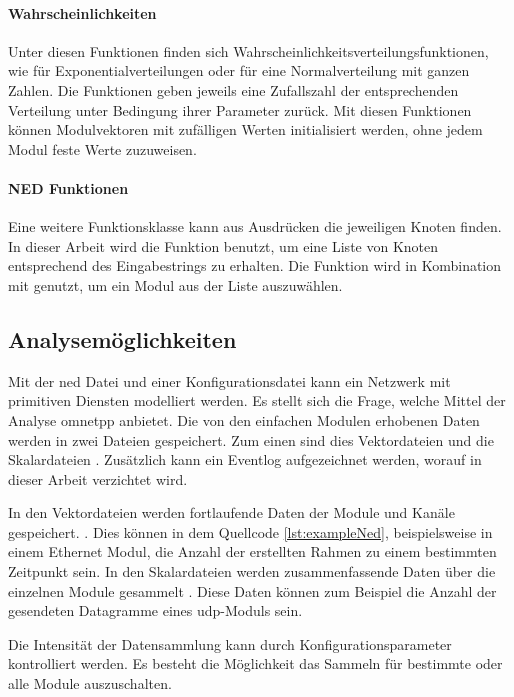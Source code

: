 \paragraph{Wahrscheinlichkeiten}
Unter diesen Funktionen finden sich Wahrscheinlichkeitsverteilungsfunktionen, wie  für Exponentialverteilungen oder  für eine Normalverteilung mit ganzen Zahlen. Die Funktionen geben jeweils eine Zufallszahl der entsprechenden Verteilung unter Bedingung ihrer Parameter zurück. Mit diesen Funktionen können Modulvektoren mit zufälligen Werten initialisiert werden, ohne jedem Modul feste Werte zuzuweisen.

\paragraph{NED Funktionen}
Eine weitere Funktionsklasse kann aus Ausdrücken die jeweiligen Knoten finden. In dieser Arbeit wird die Funktion  benutzt, um eine Liste von Knoten entsprechend des Eingabestrings zu erhalten. Die Funktion  wird in Kombination mit  genutzt, um ein Modul aus der Liste auszuwählen.

\subsection{Analysemöglichkeiten}
Mit der \gls{ned} Datei und einer Konfigurationsdatei kann ein Netzwerk mit primitiven Diensten modelliert werden. Es stellt sich die Frage, welche Mittel der Analyse \gls{omnetpp} anbietet. Die von den einfachen Modulen erhobenen Daten werden in zwei Dateien gespeichert. Zum einen sind dies Vektordateien  und die Skalardateien . Zusätzlich kann ein Eventlog aufgezeichnet werden, worauf in dieser Arbeit verzichtet wird.

In den Vektordateien werden fortlaufende Daten der Module und Kanäle gespeichert. \cite[]{OmnetManual}. Dies können in dem Quellcode \ref{lst:exampleNed}, beispielsweise in einem Ethernet Modul, die Anzahl der erstellten Rahmen zu einem bestimmten Zeitpunkt sein. In den Skalardateien werden zusammenfassende Daten über die einzelnen Module gesammelt \cite[]{OmnetManual}. Diese Daten können zum Beispiel die Anzahl der gesendeten Datagramme eines \gls{udp}-Moduls sein.

Die Intensität der Datensammlung kann durch Konfigurationsparameter kontrolliert werden. Es besteht die Möglichkeit das Sammeln für bestimmte oder alle Module auszuschalten. \cite[12.2]{OmnetManual}

